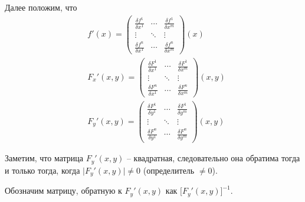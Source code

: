 \begin{note}
    Далее положим, что
    \begin{align*}
         & f'(x) = \left(\begin{matrix}
                             \frac{\delta f^1}{\delta x^1} & \cdots & \frac{\delta f^1}{\delta x^m} \\
                             \vdots                        & \ddots & \vdots                        \\
                             \frac{\delta f^n}{\delta x^1} & \cdots & \frac{\delta f^n}{\delta x^m}
                         \end{matrix}\right) (x)     \\
         & F_x'(x,y) = \left(\begin{matrix}
                                 \frac{\delta F^1}{\delta x^1} & \cdots & \frac{\delta F^1}{\delta x^m} \\
                                 \vdots                        & \ddots & \vdots                        \\
                                 \frac{\delta F^n}{\delta x^1} & \cdots & \frac{\delta F^n}{\delta x^m}
                             \end{matrix}\right) (x,y) \\
         & F_y'(x,y) = \left(\begin{matrix}
                                 \frac{\delta F^1}{\delta y^1} & \cdots & \frac{\delta F^1}{\delta y^m} \\
                                 \vdots                        & \ddots & \vdots                        \\
                                 \frac{\delta F^n}{\delta y^1} & \cdots & \frac{\delta F^n}{\delta y^m}
                             \end{matrix}\right) (x,y)
    \end{align*}

    Заметим, что матрица $ F_y'(x,y) $ -- квадратная, следовательно она обратима тогда и только тогда, когда $ \big|F_y'(x,y)\big| \ne 0 $ (определитель $ \ne 0 $).

    Обозначим матрицу, обратную к $ F_y'(x,y) $ как $ \big[F_y'(x,y)\big]^{-1} $.
\end{note}

